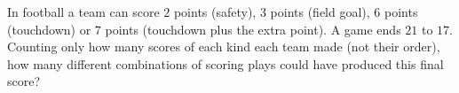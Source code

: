 In football a team can score $2$ points (safety), $3$ points (field goal), $6$ points (touchdown) or $7$ points (touchdown plus the extra point). A game ends $21$ to $17$. Counting only how many scores of each kind each team made (not their order), how many different combinations of scoring plays could have produced this final score?
